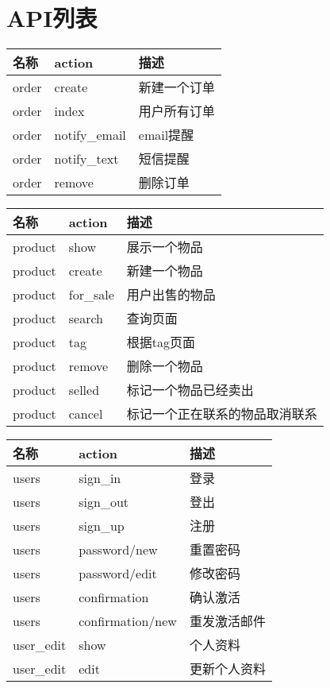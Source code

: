 \section{API列表}

\begin{center}
    \label{table:order_api_list}
    \begin{longtable}{lll}
        \toprule
        名称 & action & 描述\\
        \midrule
        order & create & 新建一个订单\\
        order & index & 用户所有订单\\
        order & notify\_email & email提醒 \\
        order & notify\_text & 短信提醒 \\
        order & remove & 删除订单 \\
        \bottomrule
    \end{longtable}
\end{center}

\begin{center}
    \label{table:product_api_list}
    \begin{longtable}{lll}
        \toprule
        名称 & action & 描述\\
        \midrule
        product & show & 展示一个物品\\
        product & create & 新建一个物品\\
        product & for\_sale & 用户出售的物品 \\
        product & search & 查询页面 \\
        product & tag & 根据tag页面 \\
        product & remove & 删除一个物品 \\
        product & selled & 标记一个物品已经卖出 \\
        product & cancel & 标记一个正在联系的物品取消联系 \\
        \bottomrule
    \end{longtable}
\end{center}

\begin{center}
    \label{table:user_api_list}
    \begin{longtable}{lll}
        \toprule
        名称 & action & 描述\\
        \midrule
        users & sign\_in & 登录\\
        users & sign\_out & 登出\\
        users & sign\_up & 注册\\
        users & password/new & 重置密码 \\
        users & password/edit & 修改密码 \\
        users & confirmation & 确认激活 \\
        users & confirmation/new & 重发激活邮件 \\
        user\_edit & show & 个人资料 \\
        user\_edit & edit & 更新个人资料 \\
        \bottomrule
    \end{longtable}
\end{center}
